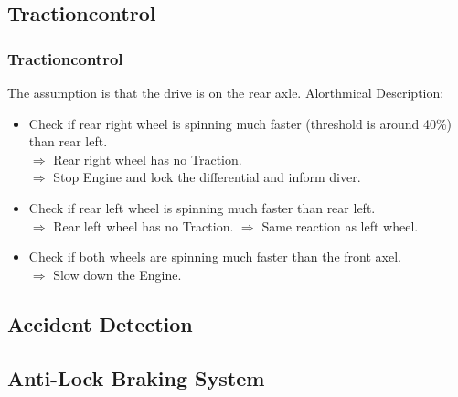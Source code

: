 \documentclass{beamer}
\begin{document}
\subsection{Tractioncontrol}
\begin{frame}
    \frametitle{Tractioncontrol}
    The assumption is that the drive is on the rear axle.
    Alorthmical Description:
    \begin{itemize}
     \item Check if rear right wheel is spinning much faster (threshold is around 40\%) than rear left.\\
     $\Rightarrow$ Rear right wheel has no Traction.\\
     $\Rightarrow$ Stop Engine and lock the differential and inform diver.
     \pause
     \item Check if rear left wheel is spinning much faster than rear left.\\
     $\Rightarrow$ Rear left wheel has no Traction. $\Rightarrow$ Same reaction as left wheel.
     \pause
     \item Check if both wheels are spinning much faster than the front axel.\\
     $\Rightarrow$ Slow down the Engine.
    \end{itemize}
\end{frame}
\subsection{Accident Detection}
\begin{frame}
\end{frame}
\subsection{Anti-Lock Braking System}
\begin{frame}
\end{frame}
\end{document}
